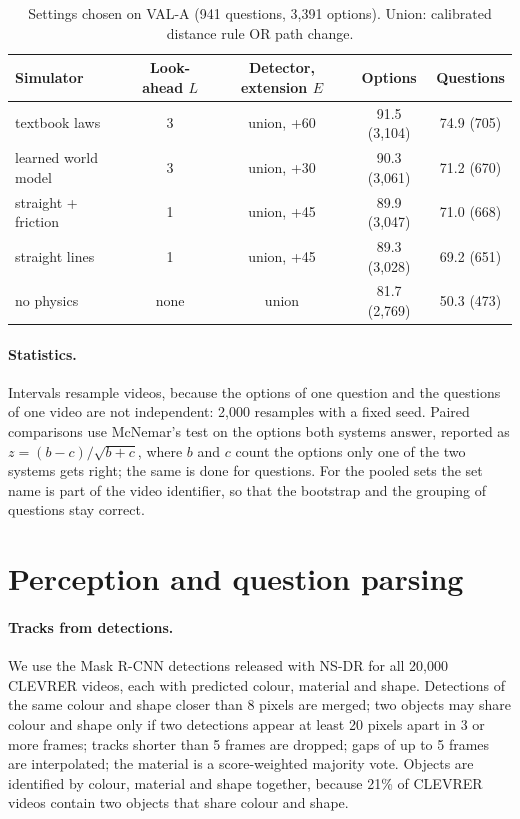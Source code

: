 \documentclass[10pt,onecolumn,letterpaper]{article}
\begin{document}
\begin{table}[h]
\caption{Settings chosen on VAL-A (941 questions, 3,391 options). Union: calibrated distance rule OR path change.}
\label{tab:val}
\centering
\small
\begin{tabular}{@{}lcccc@{}}
\toprule
Simulator & Look-ahead $L$ & Detector, extension $E$ & Options & Questions \\
\midrule
textbook laws & 3 & union, +60 & 91.5 (3,104) & 74.9 (705) \\
learned world model & 3 & union, +30 & 90.3 (3,061) & 71.2 (670) \\
straight + friction & 1 & union, +45 & 89.9 (3,047) & 71.0 (668) \\
straight lines & 1 & union, +45 & 89.3 (3,028) & 69.2 (651) \\
no physics & none & union & 81.7 (2,769) & 50.3 (473) \\
\bottomrule
\end{tabular}
\end{table}

\paragraph{Statistics.}
Intervals resample videos, because the options of one question and the questions of one video are not independent: 2,000 resamples with a fixed seed.
Paired comparisons use McNemar's test on the options both systems answer, reported as $z = (b - c)/\sqrt{b+c}$, where $b$ and $c$ count the options only one of the two systems gets right; the same is done for questions.
For the pooled sets the set name is part of the video identifier, so that the bootstrap and the grouping of questions stay correct.

\section{Perception and question parsing}
\label{app:perception}
\label{app:parser}

\paragraph{Tracks from detections.}
We use the Mask R-CNN detections released with NS-DR for all 20,000 CLEVRER videos, each with predicted colour, material and shape.
Detections of the same colour and shape closer than 8 pixels are merged; two objects may share colour and shape only if two detections appear at least 20 pixels apart in 3 or more frames; tracks shorter than 5 frames are dropped; gaps of up to 5 frames are interpolated; the material is a score-weighted majority vote.
Objects are identified by colour, material and shape together, because 21\% of CLEVRER videos contain two objects that share colour and shape.
\end{document}
